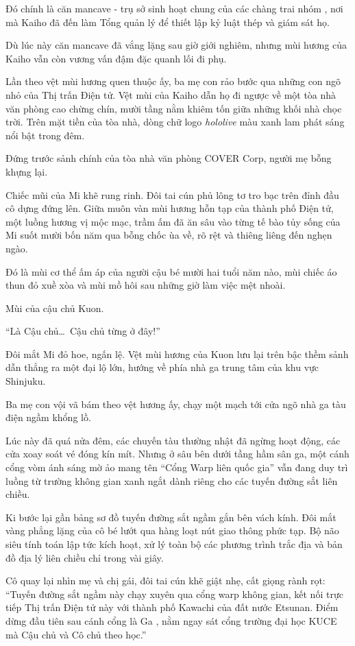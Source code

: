 \documentclass[../main.tex]{subfiles}
\begin{document}
Đó chính là căn mancave - trụ sở sinh hoạt chung của các chàng trai nhóm \hls, nơi mà Kaiho đã đến làm Tổng quản lý để thiết lập kỷ luật thép và giám sát họ.

Dù lúc này căn mancave đã vắng lặng sau giờ giới nghiêm, nhưng mùi hương của Kaiho vẫn còn vương vấn đậm đặc quanh lối đi phụ.

Lần theo vệt mùi hương quen thuộc ấy, ba mẹ con rảo bước qua những con ngõ nhỏ của Thị trấn Điện tử. Vệt mùi của Kaiho dẫn họ đi ngược về một tòa nhà văn phòng cao chừng chín, mười tầng nằm khiêm tốn giữa những khối nhà chọc trời. Trên mặt tiền của tòa nhà, dòng chữ logo \textit{hololive} màu xanh lam phát sáng nổi bật trong đêm.

Đứng trước sảnh chính của tòa nhà văn phòng COVER Corp, người mẹ bỗng khựng lại.

Chiếc mũi của Mi khẽ rung rinh. Đôi tai cún phủ lông tơ tro bạc trên đỉnh đầu cô dựng đứng lên. Giữa muôn vàn mùi hương hỗn tạp của thành phố Điện tử, một luồng hương vị mộc mạc, trầm ấm đã ăn sâu vào từng tế bào tủy sống của Mi suốt mười bốn năm qua bỗng chốc ùa về, rõ rệt và thiêng liêng đến nghẹn ngào.

Đó là mùi cơ thể ấm áp của người cậu bé mười hai tuổi năm nào, mùi chiếc áo thun đỏ xuề xòa và mùi mồ hôi sau những giờ làm việc mệt nhoài.

Mùi của cậu chủ Kuon.

``Là Cậu chủ\dots\ Cậu chủ từng ở đây!''

Đôi mắt Mi đỏ hoe, ngấn lệ. Vệt mùi hương của Kuon lưu lại trên bậc thềm sảnh dẫn thẳng ra một đại lộ lớn, hướng về phía nhà ga trung tâm của khu vực Shinjuku.

Ba mẹ con vội vã bám theo vệt hương ấy, chạy một mạch tới cửa ngõ nhà ga tàu điện ngầm khổng lồ.

Lúc này đã quá nửa đêm, các chuyến tàu thường nhật đã ngừng hoạt động, các cửa xoay soát vé đóng kín mít. Nhưng ở sâu bên dưới tầng hầm sân ga, một cánh cổng vòm ánh sáng mờ ảo mang tên ``Cổng Warp liên quốc gia'' vẫn đang duy trì luồng từ trường không gian xanh ngắt dành riêng cho các tuyến đường sắt liên chiều.

Ki bước lại gần bảng sơ đồ tuyến đường sắt ngầm gắn bên vách kính. Đôi mắt vàng phẳng lặng của cô bé lướt qua hàng loạt nút giao thông phức tạp. Bộ não siêu tính toán lập tức kích hoạt, xử lý toàn bộ các phương trình trắc địa và bản đồ địa lý liên chiều chỉ trong vài giây.

Cô quay lại nhìn mẹ và chị gái, đôi tai cún khẽ giật nhẹ, cất giọng rành rọt: ``Tuyến đường sắt ngầm này chạy xuyên qua cổng warp không gian, kết nối trực tiếp Thị trấn Điện tử này với thành phố Kawachi của đất nước Etsunan. Điểm dừng đầu tiên sau cánh cổng là Ga , nằm ngay sát cổng trường đại học KUCE mà Cậu chủ và Cô chủ theo học.''
\end{document}
